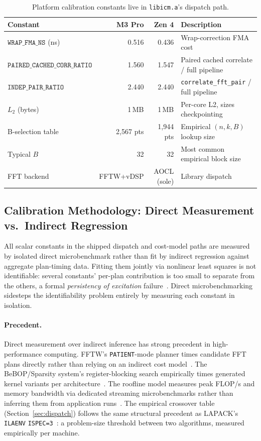 \documentclass[11pt]{article}
\begin{document}
\begin{table}[t]
\centering
\caption{Platform calibration constants live in \texttt{libicm.a}'s dispatch path.}
\label{tab:constants}
\small
\begin{tabular}{@{}lrrl@{}}
\toprule
\textbf{Constant} & \textbf{M3 Pro} & \textbf{Zen 4} & \textbf{Description} \\
\midrule
$\texttt{WRAP\_FMA\_NS}$ (ns) & 0.516 & 0.436 & Wrap-correction FMA cost \\
$\texttt{PAIRED\_CACHED\_CORR\_RATIO}$ & 1.560 & 1.547 & Paired cached correlate / full pipeline \\
$\texttt{INDEP\_PAIR\_RATIO}$ & 2.440 & 2.440 & \texttt{correlate\_fft\_pair} / full pipeline \\
$L_2$ (bytes) & 1\,MB & 1\,MB & Per-core L2, sizes checkpointing \\
B-selection table & 2{,}567 pts & 1{,}944 pts & Empirical $(n,k,B)$ lookup size \\
Typical $B$ & 32 & 32 & Most common empirical block size \\
FFT backend & FFTW+vDSP & AOCL (sole) & Library dispatch \\
\bottomrule
\end{tabular}
\end{table}

\subsection{Calibration Methodology: Direct Measurement vs.\ Indirect Regression}\label{sec:calib-methodology}

All scalar constants in the shipped dispatch and cost-model paths are
measured by isolated direct microbenchmark rather than fit by indirect
regression against aggregate plan-timing data. Fitting them jointly via
nonlinear least squares is not identifiable: several constants'
per-plan contribution is too small to separate from the others, a
formal \emph{persistency of excitation} failure~\citep{ljung1999}. Direct
microbenchmarking sidesteps the identifiability problem entirely by
measuring each constant in isolation.

\paragraph{Precedent.}
Direct measurement over indirect inference has strong precedent in
high-performance computing. FFTW's \texttt{PATIENT}-mode planner times
candidate FFT plans directly rather than relying on an indirect cost
model~\citep{frigo2005}. The BeBOP/Sparsity system's register-blocking
search empirically times generated kernel variants per
architecture~\citep{demmel2004}. The roofline model measures peak
FLOP/s and memory bandwidth via dedicated streaming microbenchmarks
rather than inferring them from application runs~\citep{williams2009}.
The empirical crossover table (Section~\ref{sec:dispatch}) follows the
same structural precedent as LAPACK's \texttt{ILAENV}
\texttt{ISPEC=3}~\citep{anderson1999}: a problem-size threshold between
two algorithms, measured empirically per machine.
\end{document}
